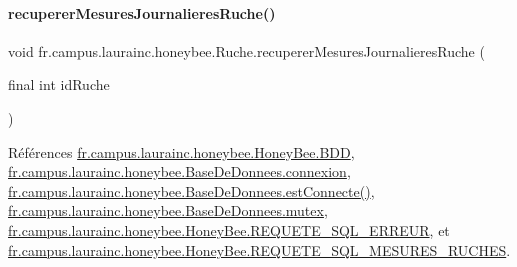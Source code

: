 \mbox{\label{classfr_1_1campus_1_1laurainc_1_1honeybee_1_1_ruche_a84de3c3af21b1cbeae2075e480acaabc}} 
\paragraph{\texorpdfstring{recuperer\+Mesures\+Journalieres\+Ruche()}{recupererMesuresJournalieresRuche()}}
{\footnotesize\ttfamily void fr.\+campus.\+laurainc.\+honeybee.\+Ruche.\+recuperer\+Mesures\+Journalieres\+Ruche (\begin{DoxyParamCaption}\item[{final int}]{id\+Ruche }\end{DoxyParamCaption})}



Références \hyperlink{classfr_1_1campus_1_1laurainc_1_1honeybee_1_1_honey_bee_abfb4f6cc1c8bb793c37ccb8408abc51c}{fr.\+campus.\+laurainc.\+honeybee.\+Honey\+Bee.\+B\+DD}, \hyperlink{classfr_1_1campus_1_1laurainc_1_1honeybee_1_1_base_de_donnees_a358899633f17b8cd00dd2c4cfdd40abe}{fr.\+campus.\+laurainc.\+honeybee.\+Base\+De\+Donnees.\+connexion}, \hyperlink{classfr_1_1campus_1_1laurainc_1_1honeybee_1_1_base_de_donnees_a735f54c2c183a595c9a9a5ba947491f5}{fr.\+campus.\+laurainc.\+honeybee.\+Base\+De\+Donnees.\+est\+Connecte()}, \hyperlink{classfr_1_1campus_1_1laurainc_1_1honeybee_1_1_base_de_donnees_a0dd6f285a11459c086adea6080bed282}{fr.\+campus.\+laurainc.\+honeybee.\+Base\+De\+Donnees.\+mutex}, \hyperlink{classfr_1_1campus_1_1laurainc_1_1honeybee_1_1_honey_bee_a275b7a8582c8193ff444d21928ef7e36}{fr.\+campus.\+laurainc.\+honeybee.\+Honey\+Bee.\+R\+E\+Q\+U\+E\+T\+E\+\_\+\+S\+Q\+L\+\_\+\+E\+R\+R\+E\+UR}, et \hyperlink{classfr_1_1campus_1_1laurainc_1_1honeybee_1_1_honey_bee_aa6c2993ef079afd106565e2748b72156}{fr.\+campus.\+laurainc.\+honeybee.\+Honey\+Bee.\+R\+E\+Q\+U\+E\+T\+E\+\_\+\+S\+Q\+L\+\_\+\+M\+E\+S\+U\+R\+E\+S\+\_\+\+R\+U\+C\+H\+ES}.



